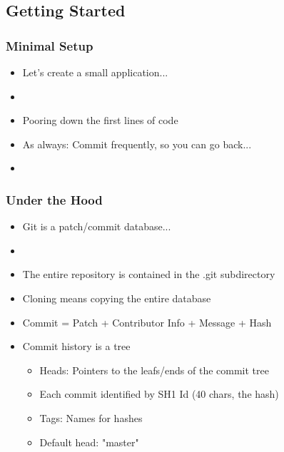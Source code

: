 \subsection{Getting Started}

\begin{slide}[fragile]
  \frametitle{Minimal Setup}
  \begin{itemize}
    \item Let's create a small application...
    \item[]
    \item Pooring down the first lines of code
    \item As always: Commit frequently, so you can go back...
    \item[]
  \end{itemize}
\end{slide}

\begin{slide}[fragile]
  \frametitle{Under the Hood}
  \begin{itemize}
    \item Git is a patch/commit database...
    \item[]
    \item The entire repository is contained in the .git subdirectory
    \item Cloning means copying the entire database
    \item Commit = Patch + Contributor Info + Message + Hash
    \item Commit history is a tree
    \begin{itemize}
      \item Heads: Pointers to the leafs/ends of the commit tree
      \item Each commit identified by SH1 Id (40 chars, the hash)
      \item Tags: Names for hashes
      \item Default head: "master"
    \end{itemize}
  \end{itemize}
\end{slide}

